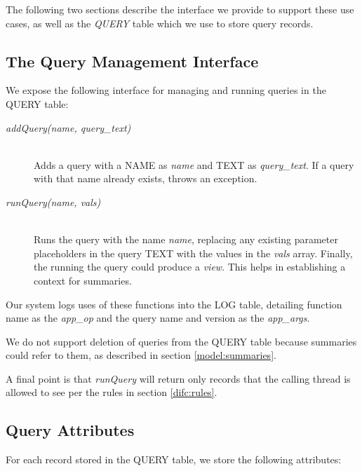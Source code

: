 The following two sections describe the interface we provide to support these use cases, as well as the \emph{QUERY} table which we use to store query records.

\subsection{The Query Management Interface}

We expose the following interface for managing and running queries in the QUERY table:
\begin{description}
  \item[\emph{addQuery(name, query\_text)}] \ \\
    Adds a query with a NAME as \emph{name}
    and TEXT as \emph{query\_text}. If a query with that
    name already exists, throws an exception.
  \item[\emph{runQuery(name, vals)}] \ \\
    Runs the query with the name \emph{name}, 
    replacing any existing
    parameter placeholders in the query TEXT with
    the values in the \emph{vals} array.
    Finally, the running the query could
    produce a \emph{view}. This helps in
    establishing a context for summaries.
\end{description}

\noindent
Our system logs uses of these functions into the LOG table, detailing function name as the \emph{app\_op} and the query name and version as the \emph{app\_args}.

We do not support deletion of queries from the QUERY table because summaries could refer to them, as described in section \ref{model:summaries}.

A final point is that \emph{runQuery} will return only records that the calling thread is allowed to see per the rules in section \ref{difc:rules}.

\subsection{Query Attributes}

For each record stored in the QUERY table, we store the following attributes:

